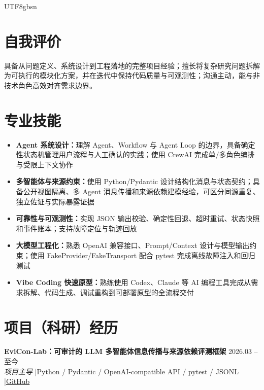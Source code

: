 \documentclass[11pt,a4paper]{article}
\begin{document}
\begin{CJK}{UTF8}{gbsn}
\section{自我评价}
具备从问题定义、系统设计到工程落地的完整项目经验；擅长将复杂研究问题拆解为可执行的模块化方案，并在迭代中保持代码质量与可观测性；沟通主动，能与非技术角色高效对齐需求边界。


\section{专业技能}
\begin{itemize}
\item \textbf{Agent 系统设计：}理解 Agent、Workflow 与 Agent Loop 的边界，具备确定性状态机管理用户流程与人工确认的实践；使用 CrewAI 完成单/多角色编排与受限上下文协作
\item \textbf{多智能体与来源约束：}使用 Python/Pydantic 设计结构化消息与状态契约；具备公开视图隔离、多 Agent 消息传播和来源依赖建模经验，可区分同源重复、独立佐证与实际暴露证据
\item \textbf{可靠性与可观测性：}实现 JSON 输出校验、确定性回退、超时重试、状态快照和事件账本；支持故障定位与轨迹回放
\item \textbf{大模型工程化：}熟悉 OpenAI 兼容接口、Prompt/Context 设计与模型输出约束；使用 FakeProvider/FakeTransport 配合 pytest 完成离线故障注入和回归测试
\item \textbf{Vibe Coding 快速原型：}熟练使用 Codex、Claude 等 AI 编程工具完成从需求拆解、代码生成、调试重构到可部署原型的全流程交付
\end{itemize}

\section{项目（科研）经历}

\textbf{EviCon-Lab：可审计的 LLM 多智能体信息传播与来源依赖评测框架} \hfill 2026.03 -- 至今 \\
\textit{项目主导} \enspace|\enspace Python / Pydantic / OpenAI-compatible API / pytest / JSONL \enspace|\enspace \href{https://github.com/Bobozane/evicon-lab}{GitHub}


\end{CJK}
\end{document}
